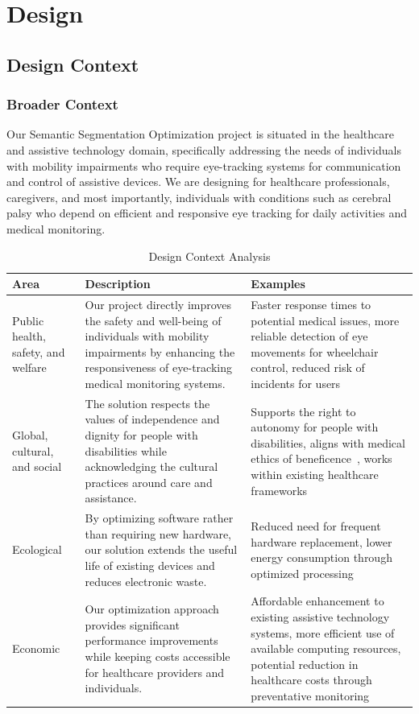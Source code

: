 \chapter{Design}\label{chap:design}

\section{Design Context}\label{sec:design-context}

\subsection{Broader Context}\label{subsec:broader-context}

Our Semantic Segmentation Optimization project is situated in the healthcare and assistive technology domain, specifically addressing the needs of individuals with mobility impairments who require eye-tracking systems for communication and control of assistive devices. We are designing for healthcare professionals, caregivers, and most importantly, individuals with conditions such as cerebral palsy who depend on efficient and responsive eye tracking for daily activities and medical monitoring.

\begin{table}[htbp]
\centering
\renewcommand{\arraystretch}{1.2}
\caption{Design Context Analysis}
\begin{tabular}{p{2.5cm}p{4.5cm}p{5.5cm}}
\toprule
\textbf{Area} & \textbf{Description} & \textbf{Examples} \\
\midrule
Public health, safety, and welfare &
Our project directly improves the safety and well-being of individuals with mobility impairments by enhancing the responsiveness of eye-tracking medical monitoring systems. &
Faster response times to potential medical issues, more reliable detection of eye movements for wheelchair control, reduced risk of incidents for users \\
\midrule
Global, cultural, and social &
The solution respects the values of independence and dignity for people with disabilities while acknowledging the cultural practices around care and assistance. &
Supports the right to autonomy for people with disabilities, aligns with medical ethics of beneficence~\cite{beauchamp2007ethics}, works within existing healthcare frameworks \\
\midrule
Ecological &
By optimizing software rather than requiring new hardware, our solution extends the useful life of existing devices and reduces electronic waste. &
Reduced need for frequent hardware replacement, lower energy consumption through optimized processing \\
\midrule
Economic &
Our optimization approach provides significant performance improvements while keeping costs accessible for healthcare providers and individuals. &
Affordable enhancement to existing assistive technology systems, more efficient use of available computing resources, potential reduction in healthcare costs through preventative monitoring \\
\bottomrule
\end{tabular}
\end{table}

